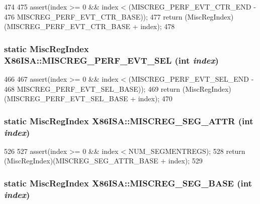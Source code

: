 \begin{DoxyCode}
474     {
475         assert(index >= 0 && index < (MISCREG_PERF_EVT_CTR_END -
476                                       MISCREG_PERF_EVT_CTR_BASE));
477         return (MiscRegIndex)(MISCREG_PERF_EVT_CTR_BASE + index);
478     }
\end{DoxyCode}
\hypertarget{namespaceX86ISA_a7808596c37e2fec948e85a3c612cd3b7}{
\subsubsection[{MISCREG\_\-PERF\_\-EVT\_\-SEL}]{\setlength{\rightskip}{0pt plus 5cm}static {\bf MiscRegIndex} X86ISA::MISCREG\_\-PERF\_\-EVT\_\-SEL (int {\em index})}}
\label{namespaceX86ISA_a7808596c37e2fec948e85a3c612cd3b7}



\begin{DoxyCode}
466     {
467         assert(index >= 0 && index < (MISCREG_PERF_EVT_SEL_END -
468                                       MISCREG_PERF_EVT_SEL_BASE));
469         return (MiscRegIndex)(MISCREG_PERF_EVT_SEL_BASE + index);
470     }
\end{DoxyCode}
\hypertarget{namespaceX86ISA_abb8ec3742a54286da349c98a1a9c9755}{
\subsubsection[{MISCREG\_\-SEG\_\-ATTR}]{\setlength{\rightskip}{0pt plus 5cm}static {\bf MiscRegIndex} X86ISA::MISCREG\_\-SEG\_\-ATTR (int {\em index})}}
\label{namespaceX86ISA_abb8ec3742a54286da349c98a1a9c9755}



\begin{DoxyCode}
526     {
527         assert(index >= 0 && index < NUM_SEGMENTREGS);
528         return (MiscRegIndex)(MISCREG_SEG_ATTR_BASE + index);
529     }
\end{DoxyCode}
\hypertarget{namespaceX86ISA_a310d36d3d8ec55a84d807cb7e1edf7d6}{
\subsubsection[{MISCREG\_\-SEG\_\-BASE}]{\setlength{\rightskip}{0pt plus 5cm}static {\bf MiscRegIndex} X86ISA::MISCREG\_\-SEG\_\-BASE (int {\em index})}}
\label{namespaceX86ISA_a310d36d3d8ec55a84d807cb7e1edf7d6}




